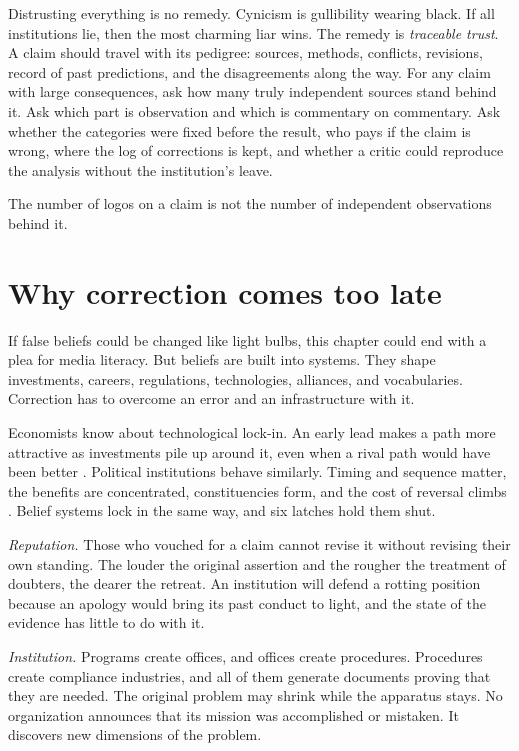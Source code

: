 \documentclass[12pt,a4paper]{book}
\begin{document}
Distrusting everything is no remedy. Cynicism is gullibility wearing black. If all institutions lie, then the most charming liar wins. The remedy is \emph{traceable trust}. A claim should travel with its pedigree: sources, methods, conflicts, revisions, record of past predictions, and the disagreements along the way. For any claim with large consequences, ask how many truly independent sources stand behind it. Ask which part is observation and which is commentary on commentary. Ask whether the categories were fixed before the result, who pays if the claim is wrong, where the log of corrections is kept, and whether a critic could reproduce the analysis without the institution's leave.

The number of logos on a claim is not the number of independent observations behind it.

\section{Why correction comes too late}

If false beliefs could be changed like light bulbs, this chapter could end with a plea for media literacy. But beliefs are built into systems. They shape investments, careers, regulations, technologies, alliances, and vocabularies. Correction has to overcome an error and an infrastructure with it.

Economists know about technological lock-in. An early lead makes a path more attractive as investments pile up around it, even when a rival path would have been better \cite{Arthur1989}. Political institutions behave similarly. Timing and sequence matter, the benefits are concentrated, constituencies form, and the cost of reversal climbs \cite{Pierson2000}. Belief systems lock in the same way, and six latches hold them shut.

\emph{Reputation.} Those who vouched for a claim cannot revise it without revising their own standing. The louder the original assertion and the rougher the treatment of doubters, the dearer the retreat. An institution will defend a rotting position because an apology would bring its past conduct to light, and the state of the evidence has little to do with it.

\emph{Institution.} Programs create offices, and offices create procedures. Procedures create compliance industries, and all of them generate documents proving that they are needed. The original problem may shrink while the apparatus stays. No organization announces that its mission was accomplished or mistaken. It discovers new dimensions of the problem.
\end{document}
